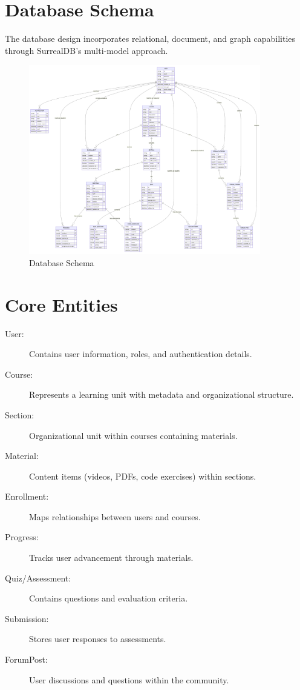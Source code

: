 \documentclass[a4paper, 11pt]{scrreprt}
\begin{document}
\section{Database Schema}
The database design incorporates relational, document, and graph capabilities through SurrealDB's multi-model approach.

\begin{figure}[ht]
    \centering
    \includegraphics[width=0.9\textwidth]{database_schema.png}
    \caption{Database Schema}
\end{figure}

\section{Core Entities}
\begin{description}
    \item[User:] Contains user information, roles, and authentication details.
    \item[Course:] Represents a learning unit with metadata and organizational structure.
    \item[Section:] Organizational unit within courses containing materials.
    \item[Material:] Content items (videos, PDFs, code exercises) within sections.
    \item[Enrollment:] Maps relationships between users and courses.
    \item[Progress:] Tracks user advancement through materials.
    \item[Quiz/Assessment:] Contains questions and evaluation criteria.
    \item[Submission:] Stores user responses to assessments.
    \item[ForumPost:] User discussions and questions within the community.
\end{description}
\end{document}
